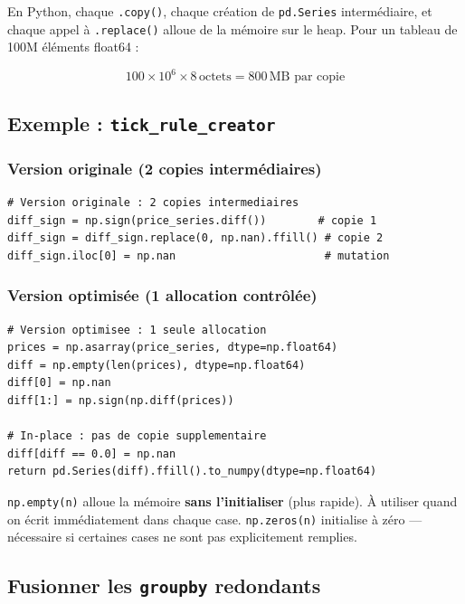 \documentclass[11pt, a4paper]{article}
\begin{document}
En Python, chaque \texttt{.copy()}, chaque cr\'eation de \texttt{pd.Series}
interm\'ediaire, et chaque appel \`a \texttt{.replace()} alloue de la m\'emoire
sur le heap. Pour un tableau de 100M \'el\'ements float64 :

\begin{equation}
    100 \times 10^6 \times 8\,\text{octets} = 800\,\text{MB par copie}
\end{equation}

\subsection{Exemple : \texttt{tick\_rule\_creator}}

\subsubsection{Version originale (2 copies interm\'ediaires)}
\begin{lstlisting}
# Version originale : 2 copies intermediaires
diff_sign = np.sign(price_series.diff())        # copie 1
diff_sign = diff_sign.replace(0, np.nan).ffill() # copie 2
diff_sign.iloc[0] = np.nan                       # mutation
\end{lstlisting}

\subsubsection{Version optimis\'ee (1 allocation contr\^ol\'ee)}
\begin{lstlisting}
# Version optimisee : 1 seule allocation
prices = np.asarray(price_series, dtype=np.float64)
diff = np.empty(len(prices), dtype=np.float64)
diff[0] = np.nan
diff[1:] = np.sign(np.diff(prices))

# In-place : pas de copie supplementaire
diff[diff == 0.0] = np.nan
return pd.Series(diff).ffill().to_numpy(dtype=np.float64)
\end{lstlisting}

\begin{tipbox}
\texttt{np.empty(n)} alloue la m\'emoire \textbf{sans l'initialiser} (plus rapide).
\`A utiliser quand on \'ecrit imm\'ediatement dans chaque case.
\texttt{np.zeros(n)} initialise \`a z\'ero --- n\'ecessaire si certaines cases
ne sont pas explicitement remplies.
\end{tipbox}


\subsection{Fusionner les \texttt{groupby} redondants}
\end{document}
